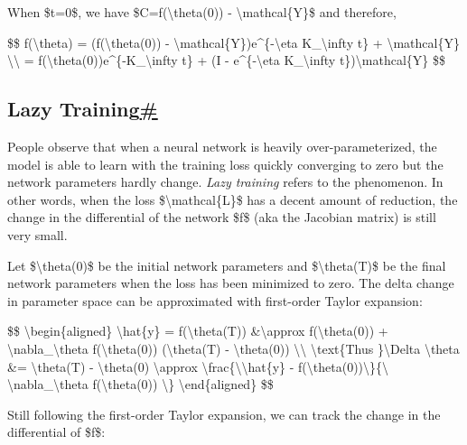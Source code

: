 When \$t=0\$, we have \$C=f(\textbackslash theta(0)) - \textbackslash mathcal\{Y\}\$ and therefore,

\$\$ f(\textbackslash theta) = (f(\textbackslash theta(0)) - \textbackslash mathcal\{Y\})e\^{}\{-\textbackslash eta K\_\textbackslash infty t\} + \textbackslash mathcal\{Y\} \textbackslash\textbackslash{} = f(\textbackslash theta(0))e\^{}\{-K\_\textbackslash infty t\} + (I - e\^{}\{-\textbackslash eta K\_\textbackslash infty t\})\textbackslash mathcal\{Y\} \$\$

\subsection{\texorpdfstring{Lazy Training\hyperref[lazy-training]{\#}}{Lazy Training\#}}\label{lazy-training}

People observe that when a neural network is heavily over-parameterized, the model is able to learn with the training loss quickly converging to zero but the network parameters hardly change. \emph{Lazy training} refers to the phenomenon. In other words, when the loss \$\textbackslash mathcal\{L\}\$ has a decent amount of reduction, the change in the differential of the network \$f\$ (aka the Jacobian matrix) is still very small.

Let \$\textbackslash theta(0)\$ be the initial network parameters and \$\textbackslash theta(T)\$ be the final network parameters when the loss has been minimized to zero. The delta change in parameter space can be approximated with first-order Taylor expansion:

\$\$ \textbackslash begin\{aligned\} \textbackslash hat\{y\} = f(\textbackslash theta(T)) \&\textbackslash approx f(\textbackslash theta(0)) + \textbackslash nabla\_\textbackslash theta f(\textbackslash theta(0)) (\textbackslash theta(T) - \textbackslash theta(0)) \textbackslash\textbackslash{} \textbackslash text\{Thus \}\textbackslash Delta \textbackslash theta \&= \textbackslash theta(T) - \textbackslash theta(0) \textbackslash approx \textbackslash frac\{\textbackslash\textbar\textbackslash hat\{y\} - f(\textbackslash theta(0))\textbackslash\textbar\}\{\textbackslash\textbar{} \textbackslash nabla\_\textbackslash theta f(\textbackslash theta(0)) \textbackslash\textbar\} \textbackslash end\{aligned\} \$\$

Still following the first-order Taylor expansion, we can track the change in the differential of \$f\$:

